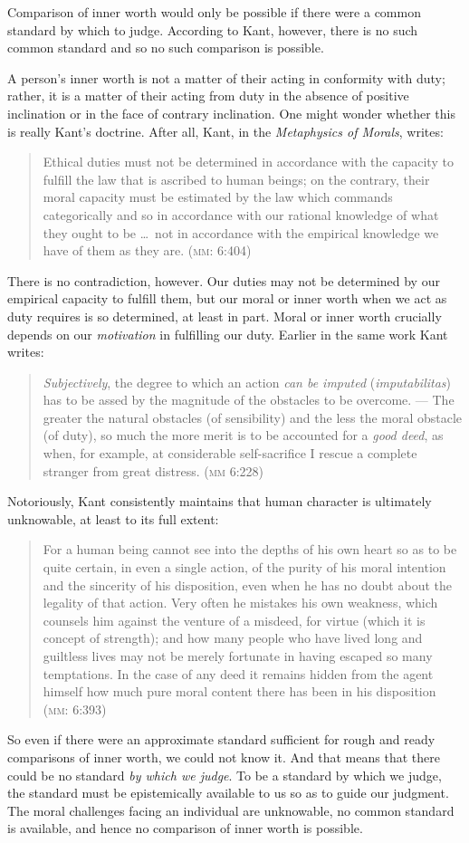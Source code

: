 \documentclass[a4paper,12pt]{article}
\begin{document}
Comparison of inner worth would only be possible if there were a common standard by which to judge. According to Kant, however, there is no such common standard and so no such comparison is possible.

A person's inner worth is not a matter of their acting in conformity with duty; rather, it is a matter of their acting from duty in the absence of positive inclination or in the face of contrary inclination.  
One might wonder whether this is really Kant's doctrine. After all, Kant, in the \emph{Metaphysics of Morals}, writes:
\begin{quote}
	Ethical duties must not be determined in accordance with the capacity to fulfill the law that is ascribed to human beings; on the contrary, their moral capacity must be estimated by the law which commands categorically and so in accordance with our rational knowledge of what they ought to be \ldots\ not in accordance with the empirical knowledge we have of them as they are. (\textsc{mm}: 6:404)
\end{quote}
There is no contradiction, however. Our duties may not be determined by our empirical capacity to fulfill them, but our moral or inner worth when we act as duty requires is so determined, at least in part. Moral or inner worth crucially depends on our \emph{motivation} in fulfilling our duty. Earlier in the same work Kant writes:
\begin{quote}
	\emph{Subjectively}, the degree to which an action \emph{can be imputed} (\emph{imputabilitas}) has to be assed by the magnitude of the obstacles to be overcome. --- The greater the natural obstacles (of sensibility) and the less the moral obstacle (of duty), so much the more merit is to be accounted for a \emph{good deed}, as when, for example, at considerable self-sacrifice I rescue a complete stranger from great distress. (\textsc{mm} 6:228)
\end{quote}

Notoriously, Kant consistently maintains that human character is ultimately unknowable, at least to its full extent:
\begin{quote}
	For a human being cannot see into the depths of his own heart so as to be quite certain, in even a single action, of the purity of his moral intention and the sincerity of his disposition, even when he has no doubt about the legality of that action. Very often he mistakes his own weakness, which counsels him against the venture of a misdeed, for virtue (which it is concept of strength); and how many people who have lived long and guiltless lives may not be merely fortunate in having escaped so many temptations. In the case of any deed it remains hidden from the agent himself how much pure moral content there has been in his disposition (\textsc{mm}: 6:393)
\end{quote}
So even if there were an approximate standard sufficient for rough and ready comparisons of inner worth, we could not know it. And that means that there could be no standard \emph{by which we judge}. To be a standard by which we judge, the standard must be epistemically available to us so as to guide our judgment. The moral challenges facing an individual are unknowable, no common standard is available, and hence no comparison of inner worth is possible.
\end{document}
